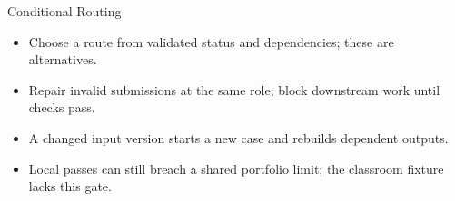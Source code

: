 \begin{frame}{Conditional Routing}
\setlength{\topsep}{0pt}
\begin{center}\resizebox{.94\textwidth}{!}{}\end{center}
\begin{itemize}
\item Choose a route from validated status and dependencies; these are alternatives.
\item Repair invalid submissions at the same role; block downstream work until checks pass.
\item A changed input version starts a new case and rebuilds dependent outputs.
\item Local passes can still breach a shared portfolio limit; the classroom fixture lacks this gate.
\end{itemize}
\end{frame}
